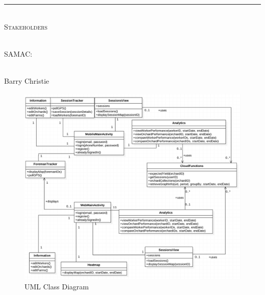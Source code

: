 \documentclass[12pt]{article}
\begin{document}
\begin{titlepage}
\begin{center}
		\vspace{1cm}
		\rule{\linewidth}{0.5mm} \\[1cm]
		\textsc{\Large Stakeholders}\\[1cm]

		\begin{minipage}{0.4\textwidth}
			\begin{flushleft} \large
				\emph{} \\
				SAMAC:
			\end{flushleft}
		\end{minipage}
		\begin{minipage}{0.4\textwidth}
			\begin{flushright} \large
				\emph{} \\
				Barry Christie
			\end{flushright}
		\end{minipage}


	\end{center}
\end{titlepage}

\newpage
{}
\tableofcontents
\newpage
\listoffigures

\newpage
{}

\begin{figure}
\includegraphics[width=1.0\linewidth]{UMLClassDiag.png}
\caption{UML Class Diagram}
\label{UMLClassDiag}
\end{figure}
\newpage
\end{document}

